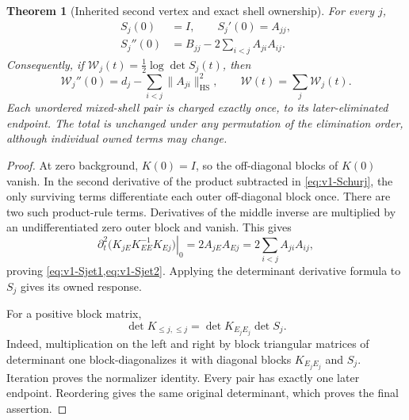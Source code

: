 \documentclass[11pt,a4paper]{article}
\newtheorem{theorem}{Theorem}[section]
\theoremstyle{definition}
\theoremstyle{remark}
\newcommand{\norm}[1]{\lVert #1\rVert}
\newcommand{\HS}{\mathrm{HS}}
\begin{document}
\begin{theorem}[Inherited second vertex and exact shell ownership]
\label{thm:v1-owner}
For every $j$,
\begin{align}
 S_j(0)&=I,\qquad S_j'(0)=A_{jj},\label{eq:v1-Sjet1}\\
 S_j''(0)&=B_{jj}-2\sum_{i<j}A_{ji}A_{ij}.\label{eq:v1-Sjet2}
\end{align}
Consequently, if $\mathcal W_j(t)=\tfrac12\log\det S_j(t)$, then
\begin{equation}\label{eq:v1-owner}
 \boxed{\displaystyle
 \mathcal W_j''(0)=d_j-\sum_{i<j}\norm{A_{ji}}_\HS^2,
 \qquad \mathcal W(t)=\sum_j\mathcal W_j(t).}
\end{equation}
Each unordered mixed-shell pair is charged exactly once, to its
later-eliminated endpoint. The total is unchanged under any permutation
of the elimination order, although individual owned terms may change.
\end{theorem}
\begin{proof}
At zero background, $K(0)=I$, so the off-diagonal blocks of $K(0)$ vanish.
In the second derivative of the product subtracted in
\cref{eq:v1-Schurj}, the only surviving terms differentiate each outer
off-diagonal block once. There are two such product-rule terms. Derivatives
of the middle inverse are multiplied by an undifferentiated zero outer
block and vanish. This gives
\[
 \left.\partial_t^2\bigl(K_{jE}K_{EE}^{-1}K_{Ej}\bigr)\right|_0
      =2A_{jE}A_{Ej}=2\sum_{i<j}A_{ji}A_{ij},
\]
proving \cref{eq:v1-Sjet1,eq:v1-Sjet2}. Applying the determinant derivative
formula to $S_j$ gives its owned response.

For a positive block matrix,
\[
 \det K_{\le j,\le j}=\det K_{E_jE_j}\det S_j.
\]
Indeed, multiplication on the left and right by block triangular matrices
of determinant one block-diagonalizes it with diagonal blocks
$K_{E_jE_j}$ and $S_j$. Iteration proves the normalizer identity. Every
pair has exactly one later endpoint. Reordering gives the same original
determinant, which proves the final assertion.
\end{proof}
\end{document}
